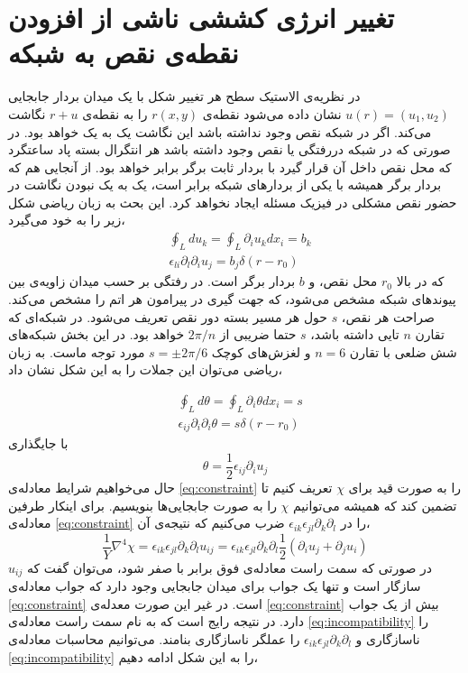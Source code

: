 \section{
تغییر انرژی کششی ناشی از افزودن نقطه‌ی نقص به شبکه
}
در نظریه‌ی الاستیک سطح هر تغییر شکل با یک میدان بردار جابجایی 
$u(r)=(u_1,u_2)$
نشان داده می‌شود نقطه‌ی 
$r(x,y)$
را به نقطه‌ی 
$r+u$
نگاشت می‌کند. اگر در شبکه نقص وجود نداشته باشد این نگاشت یک به یک خواهد بود. در صورتی که در شبکه دررفتگی
یا نقص وجود داشته باشد هر انتگرال بسته پاد ساعتگرد که محل نقص داخل آن قرار گیرد با بردار ثابت برگر
برابر خواهد بود.
\cite{mitchell1961}
از آنجایی هم که بردار برگر همیشه با یکی از بردارهای شبکه برابر است، یک به یک نبودن نگاشت در حضور نقص مشکلی در فیزیک مسئله ایجاد نخواهد کرد. این بحث به زبان ریاضی شکل زیر را به خود می‌گیرد،
\begin{equation}
\begin{aligned}
&\oint_Ldu_k=\oint_L\partial_iu_kdx_i=b_k\\
&\epsilon_{li}\partial_l\partial_iu_j=b_j\delta(r-r_0)
\end{aligned}
\end{equation}
که در بالا 
$r_0$
محل نقص، و 
$b$
 بردار برگر است. در رفتگی  بر حسب میدان زاویه‌ی بین پیوندهای شبکه مشخص می‌شود، که جهت گیری در پیرامون هر اتم را مشخص می‌کند. صراحت هر نقص،
 $s$
 حول هر مسیر بسته دور نقص تعریف می‌شود. در شبکه‌ای که تقارن $n$
 تایی داشته باشد، 
 $s$ حتما ضریبی از 
 $2\pi/n$ خواهد بود.
 در این بخش شبکه‌های شش ضلعی با تقارن 
 $n=6$
و لغزش‌های کوچک
$s=\pm2\pi/6$
مورد توجه ماست. به زبان ریاضی می‌توان این جملات را به این شکل نشان داد،

 \begin{equation}
\begin{aligned}
&\oint_Ld\theta=\oint_L\partial_i\theta dx_i=s\\
&\epsilon_{ij}\partial_i\partial_i\theta=s\delta(r-r_0)
\label{eq:thetauij}
\end{aligned}
\end{equation}
با جایگذاری
\begin{equation}
\theta=\frac{1}{2}\epsilon_{ij}\partial_iu_j
\end{equation}
حال می‌خواهیم شرایط معادله‌ی 
\ref{eq:constraint}
را به صورت قید برای $\chi$
تعریف کنیم تا تضمین کند که همیشه می‌توانیم $\chi$
را به صورت جابجایی‌ها بنویسیم. برای اینکار طرفین معادله‌ی 
\ref{eq:constraint}
را در 
$\epsilon_{ik}\epsilon_{jl}\partial_k\partial_l$
ضرب می‌کنیم که نتیجه‌ی آن،
\begin{equation}
\frac{1}{Y}\nabla^4\chi=\epsilon_{ik}\epsilon_{jl}\partial_k\partial_lu_{ij}=\epsilon_{ik}\epsilon_{jl}\partial_k\partial_l\frac{1}{2}(\partial_iu_j+\partial_ju_i)
\label{eq:incompatibility}
\end{equation}
در صورتی که سمت راست معادله‌ی فوق برابر با صفر شود، می‌توان گفت که $u_{ij}$ 
سازگار است و تنها یک جواب برای میدان جابجایی وجود دارد که جواب معادله‌ی 
\ref{eq:constraint}
است. در غیر این صورت معدله‌ی 
\ref{eq:constraint}
بیش از یک جواب دارد. در نتیجه رایج است که به نام سمت راست معادله‌ی
\ref{eq:incompatibility}
را ناسازگاری
و $\epsilon_{ik}\epsilon_{jl}\partial_k\partial_l$
را عملگر ناسازگاری بنامند. می‌توانیم محاسبات معادله‌ی 
\ref{eq:incompatibility}
را به این شکل ادامه دهیم،

